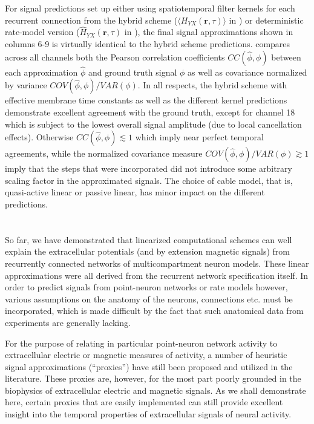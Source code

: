 For signal predictions set up either using spatiotemporal filter kernels for each recurrent connection from the hybrid scheme ($\langle H_{YX}(\mathbf{r}, \tau) \rangle$ in ) or deterministic rate-model version  ($\hat{H}_{YX}(\mathbf{r}, \tau)$ in ), 
the final signal approximations shown in  columns 6-9 is virtually identical to the hybrid scheme predictions. 
 compares across all channels both the Pearson correlation coefficients $CC(\hat{\phi}, \phi)$ between each approximation $\hat{\phi}$ and ground truth signal $\phi$ as well as covariance normalized by variance $COV(\hat{\phi}, \phi)/VAR(\phi)$. 
In all respects, the hybrid scheme with effective membrane time constants as well as the different kernel predictions demonstrate excellent agreement with the ground truth, except for channel 18 which is subject to the lowest overall signal amplitude (due to local cancellation effects). 
Otherwise $CC(\hat{\phi}, \phi) \lesssim 1$ which imply near perfect temporal agreements, 
while the normalized covariance measure $COV(\hat{\phi}, \phi)/VAR(\phi) \gtrsim 1$ imply that the steps that were incorporated did not introduce some arbitrary scaling factor in the approximated signals. 
The choice of cable model, that is, quasi-active linear or passive linear, has minor impact on the different predictions.   


\section{}
\label{sec:Schemes:proxies}

So far, we have demonstrated that linearized computational schemes can well explain the extracellular potentials (and by extension magnetic signals) from recurrently connected networks of multicompartment neuron models. 
These linear approximations were all derived from the recurrent network specification itself. 
In order to predict signals from point-neuron networks or rate models however, 
various assumptions on the anatomy of the neurons, connections etc. must be incorporated, 
which is made difficult by the fact that such anatomical data from experiments are generally lacking. 

For the purpose of relating in particular point-neuron network activity to extracellular electric or magnetic measures of activity,
a number of heuristic signal approximations (``proxies'') have still been proposed and utilized in the literature. 
These proxies are, however, for the most part poorly grounded in the biophysics of extracellular electric and magnetic signals. 
As we shall demonstrate here, certain proxies that are easily implemented can still provide excellent insight into the temporal properties of extracellular signals of neural activity.

